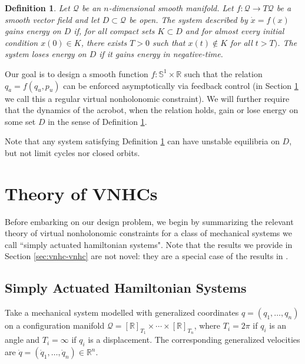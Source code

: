 \documentclass[journal,twoside,web]{ieeecolor}
\newtheorem{defn}{Definition} %
\newcommand*{\Rt}[1]{[\R]_{#1}}
\newcommand*{\R}{\mathbb{R}}
\newcommand*{\Sone}{\mathbb{S}^1}
\begin{document}
\begin{defn}\label{defn:energy-gain}
    Let \(\mathcal{Q}\) be an
    \(n\)-dimensional smooth manifold. 
    Let \(f : \mathcal{Q} \rightarrow T\mathcal{Q}\) be a smooth vector
    field and let \(D \subset \mathcal{Q}\) be open.
    The system described by \(\dot{x} = f(x)\) 
    \textit{gains energy on \(D\)} if, 
    for all compact sets \(K \subset D\) and for almost every initial
    condition \(x(0) \in K\), there exists \(T > 0\) such
    that \(x(t) \notin K\) for all \(t > T)\).
    The system \textit{loses energy on \(D\)} if it gains energy in
    negative-time.
\end{defn}

Our goal is to design a smooth function \(f : \Sone \times \R\) such that the
relation \(q_a = f(q_u,p_u)\) can be enforced asymptotically via feedback
control (in Section \ref{sec:vnhc} we call this a regular virtual
nonholonomic constraint).  
We will further require that the dynamics of the acrobot, when the relation
holds, gain or lose energy on some set \(D\) in the sense of Definition
\ref{defn:energy-gain}. 

Note that any system satisfying Definition \ref{defn:energy-gain}
can have unstable equilibria on \(D\), but not limit cycles nor closed orbits.

\section{Theory of VNHCs}\label{sec:vnhc}
Before embarking on our design problem, we begin by summarizing the relevant
theory of virtual nonholonomic constraints for a class of mechanical systems we
call ``simply actuated hamiltonian systems". 
Note that the results we provide in Section \ref{sec:vnhc-vnhc} are not novel:
they are a special case of the results in
\cite{hybrid_zero_dynamics_bipedal_nhvcs}.

\subsection{Simply Actuated Hamiltonian Systems} \label{sec:vnhc-sah}
Take a mechanical system modelled with generalized coordinates 
\(q = (q_1, \ldots, q_n)\) on a configuration manifold
\(\mathcal{Q} = \Rt{T_1} \times \cdots \times \Rt{T_n}\), where
\(T_i = 2\pi\) if \(q_i\) is an angle and \(T_i = \infty\) if \(q_i\) is a
displacement. The corresponding generalized velocities are 
\(\dot{q} = (\dot{q}_1,\ldots,\dot{q}_n) \in \R^n\).
\end{document}
